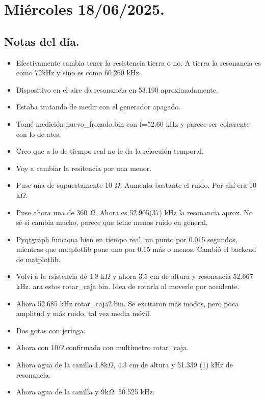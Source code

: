 \section{Miércoles 18/06/2025.}

\subsection*{Notas del día.}
\begin{itemize}
	\item Efectivamente cambia tener la resistencia tierra o no. A tierra la resonancia es como 72kHz y sino es como 60.260 kHz. 
	\item Dispositivo en el aire da resonancia en 53.190 aproximadamente. 
	\item Estaba tratando de medir con el generador apagado. 
	\item Tomé medición nuevo\_frozado.bin con f=52.60 kHz y parece ser coherente con lo de ates.
	\item Creo que a lo de tiempo real no le da la relocuión temporal. 
	\item Voy a cambiar la resitencia por una menor. 
	\item Puse una de supuestamente 10 $\Omega$. Aumenta bastante el ruido. Por ahí era 10 k$\Omega$. 
	\item Puse ahora una de 360 $\Omega$. Ahora es 52.905(37) kHz la resonancia aprox. No sé si cambia mucho, parece que teine menos ruido en general.  
	\item Pyqtgraph funciona bien en tiempo real, un punto por 0.015 segundos, mientras que matplotlib pone uno por 0.15 más o menos. Cambió el backend de matplotlib.
	\item Volví a la rsistencia de 1.8 k$\Omega$ y ahora 3.5 cm de altura y resonancia 52.667 kHz. ara estos rotar\_caja.bin. Idea de rotarla al moverlo por accidente.
	\item Ahora 52.685 kHz rotar\_caja2.bin. Se excitaron más modos, pero poca amplitud y más ruido, tal vez media móvil.
	\item Dos gotas con jeringa. 
	\item Ahora con 10$\Omega$ confirmado con multímetro rotar\_caja. 
	
	\item Ahora agua de la canilla 1.8k$\Omega$, 4.3 cm de altura y 51.339 (1) kHz de resonancia. 
	\item Ahora agua de la canilla y 9k$\Omega$. 50.525 kHz.
	

\end{itemize}
